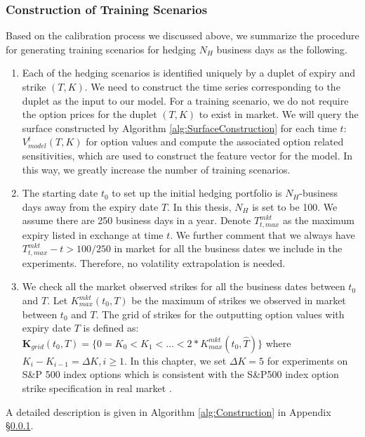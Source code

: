 \documentclass[letterpaper,12pt,titlepage,oneside,final]{book}
\numberwithin{equation}{section}
\theoremstyle{definition}
\begin{document}
\subsubsection{Construction of Training Scenarios}
Based on the calibration process we discussed above, we summarize the procedure for generating training scenarios for hedging $N_H$ business days as the following. \begin{enumerate}
	\item Each of the hedging scenarios is identified uniquely by a duplet of expiry and strike  $(T,K)$. We need to construct the time series corresponding to the duplet as the input to our model. For a training scenario, we do not require the option prices for the  duplet $(T,K)$ to exist in market. We will query the surface constructed by Algorithm \ref{alg:SurfaceConstruction} for each time $t$: $V_{model}^t(T,K)$ for option values and compute the associated option related sensitivities, which are used to construct the feature vector for the model. In this way, we greatly increase the number of training scenarios.  
	\item The starting date $t_0$ to set up the initial hedging portfolio is  $N_H$-business days away from the expiry date $T$. In this thesis,  $N_H$ is set to be 100.  We assume there are 250 business days in a year. Denote $T_{t,max}^{mkt}$ as the maximum expiry listed in exchange at time $t$. We further comment that we always have $T_{t,max}^{mkt}-t>100/250$ in market for all the business dates we include in the experiments.  Therefore, no volatility extrapolation is needed.
	\item We check all the market observed strikes for all the business dates between $t_0$ and  $T$. Let $K^{mkt}_{max}(t_0,T)$ be the maximum of  strikes we observed in market  between $t_0$ and  $T$. The grid of strikes for the outputting option values with expiry date $T$ is defined as: $\mathbf{K}_{grid}(t_0,{T})=\{0=K_0<K_1<\dots<2*K^{mkt}_{max}(t_0,\widehat{T})\}$ where $K_i-K_{i-1}=\Delta K, i \geq 1$. In this chapter, we set $\Delta K=5$ for experiments on S\&P 500 index options which is consistent with the S\&P500 index option strike specification in real market \cite{hull2006options}.
\end{enumerate}
A detailed description is given in Algorithm \ref{alg:Construction} in Appendix \S \ref{}.
\end{document}
